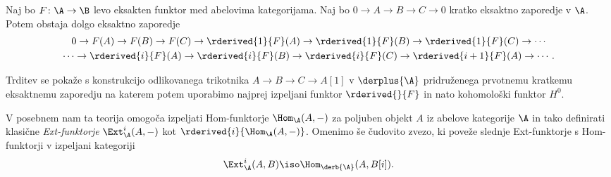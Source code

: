 \begin{trditev}
    \label{dolgo eksaktno zaporedje izpeljanega funktorja}
    Naj bo $F \colon \A \to \B$ levo eksakten funktor med abelovima kategorijama. Naj bo $0 \to A \to B \to C \to 0$ kratko eksaktno zaporedje v $\A$. Potem obstaja dolgo eksaktno zaporedje 
    \begin{multline*}
        0 \to F(A) \to F(B) \to F(C) \to \rderived{1}{F}(A) \to \rderived{1}{F}(B) \to \rderived{1}{F}(C) \to \cdots \\
        \cdots \to \rderived{i}{F}(A) \to \rderived{i}{F}(B) \to \rderived{i}{F}(C) \to \rderived{i+1}{F}(A) \to \cdots.
    \end{multline*}
\end{trditev}
Trditev se pokaže s konstrukcijo odlikovanega trikotnika $A \to B \to C \to A[1]$ v $\derplus{\A}$ pridruženega prvotnemu kratkemu eksaktnemu zaporedju na katerem potem uporabimo najprej izpeljani funktor $\rderived{}{F}$ in nato kohomološki funktor $H^0$.

V posebnem nam ta teorija omogoča izpeljati Hom-funktorje $\Hom_\A(A, -)$ za poljuben objekt $A$ iz abelove kategorije $\A$ in tako definirati klasične \emph{Ext-funktorje} $\Ext^i_\A(A, -)$ kot $\rderived{i}{\Hom_\A(A,-)}$. Omenimo še čudovito zvezo, ki poveže slednje Ext-funktorje s Hom-funktorji v izpeljani kategoriji
\begin{equation}
    \label{eq: čudovita enačba}
    \Ext^i_\A(A, B) \iso \Hom_{\derb{\A}}(A, B[i]).
\end{equation}  




